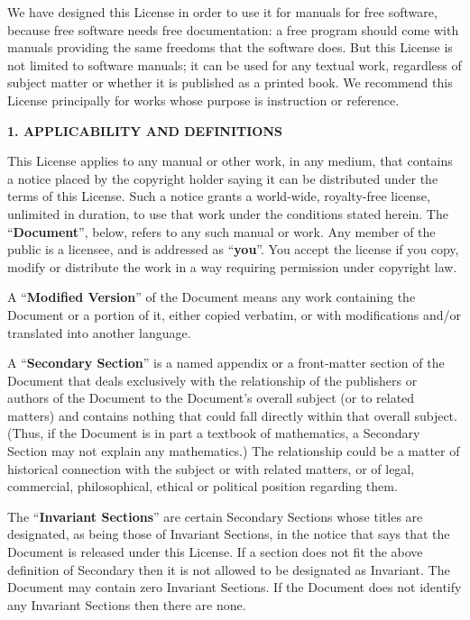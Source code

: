 We have designed this License in order to use it for manuals for free
software, because free software needs free documentation: a free
program should come with manuals providing the same freedoms that the
software does.  But this License is not limited to software manuals;
it can be used for any textual work, regardless of subject matter or
whether it is published as a printed book.  We recommend this License
principally for works whose purpose is instruction or reference.


\begin{center}
{\Large\bf 1. APPLICABILITY AND DEFINITIONS\par}
{}
\end{center}

This License applies to any manual or other work, in any medium, that
contains a notice placed by the copyright holder saying it can be
distributed under the terms of this License.  Such a notice grants a
world-wide, royalty-free license, unlimited in duration, to use that
work under the conditions stated herein.  The ``\textbf{Document}'', below,
refers to any such manual or work.  Any member of the public is a
licensee, and is addressed as ``\textbf{you}''.  You accept the license if you
copy, modify or distribute the work in a way requiring permission
under copyright law.

A ``\textbf{Modified Version}'' of the Document means any work containing the
Document or a portion of it, either copied verbatim, or with
modifications and/or translated into another language.

A ``\textbf{Secondary Section}'' is a named appendix or a front-matter section of
the Document that deals exclusively with the relationship of the
publishers or authors of the Document to the Document's overall subject
(or to related matters) and contains nothing that could fall directly
within that overall subject.  (Thus, if the Document is in part a
textbook of mathematics, a Secondary Section may not explain any
mathematics.)  The relationship could be a matter of historical
connection with the subject or with related matters, or of legal,
commercial, philosophical, ethical or political position regarding
them.

The ``\textbf{Invariant Sections}'' are certain Secondary Sections whose titles
are designated, as being those of Invariant Sections, in the notice
that says that the Document is released under this License.  If a
section does not fit the above definition of Secondary then it is not
allowed to be designated as Invariant.  The Document may contain zero
Invariant Sections.  If the Document does not identify any Invariant
Sections then there are none.

